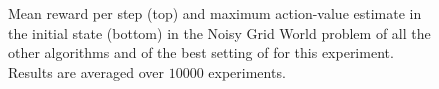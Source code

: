 \documentclass[conference]{IEEEtran}
\begin{document}
\begin{figure}[t]
\begin{minipage}{\columnwidth}
\end{minipage}
  \caption{Mean reward per step (top) and maximum action-value estimate in the initial state (bottom) in the Noisy Grid World problem of all the other algorithms and of the best setting of \alg for this experiment. Results are averaged over $10000$ experiments.}
  \label{F:hasselt_all}
\end{figure}
\end{document}
